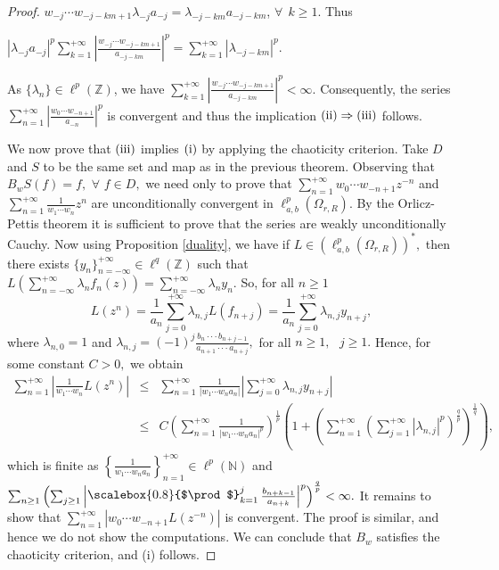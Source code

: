 \documentclass[12pt, reqno]{amsart}
\DeclareMathOperator*{\Mprod}{\text{\raisebox{0.25ex}{\scalebox{0.8}{$\prod$}}}}
\theoremstyle{definition}
\theoremstyle{remark}
\numberwithin{equation}{section}
\begin{document}
\begin{proof}
$w_{-j}\cdots w_{-j-km+1}\lambda_{-j}a_{-j}=\lambda_{-j-km}a_{-j-km}$, $\forall~~ k \geq 1.$ Thus
\begin{center}
$|\lambda_{-j}a_{-j}|^{p}\displaystyle\sum_{k=1}^{+\infty} \left\lvert\frac{w_{-j}\cdots w_{-j-km+1}}{a_{-j-km}}\right\rvert^{p}=\sum_{k=1}^{+\infty} \left\lvert\lambda_{-j-km}\right\rvert^{p}.$
\end{center}
 As $\{\lambda_{n}\} \in \ell^{p}(\mathbb{Z})$, we have $\sum_{k=1}^{+\infty} \left\lvert\frac{w_{-j}\cdots w_{-j-km+1}}{a_{-j-km}}\right\rvert^{p}<\infty.$ Consequently, the series\\ $\sum_{n=1}^{+\infty}\left\lvert  \frac{w_{0}\cdots w_{-n+1}}{a_{-n}}\right\rvert^{p}$ is convergent and thus the implication $\textnormal{(ii)} \Rightarrow \textnormal{(iii)}$ follows.

 We now prove that  $\textnormal{(iii)}$ implies $\textnormal{(i)}$ by applying the chaoticity criterion. Take $D$ and $S$ to be the same set and map as in the previous theorem. Observing that $B_{w}S(f)=f,$ $\forall$ $f\in D,$ we need only to prove that $\sum_{n=1}^{+\infty}w_{0}\cdots w_{-n+1}z^{-n}$ and  $ \sum_{n=1}^{+\infty} \frac{1}{w_{1}\cdots w_{n}}z^{n}$ are unconditionally convergent in $\ell^{p}_{a,b}(\Omega_{r,R}).$ By the Orlicz-Pettis theorem it is sufficient to prove that the series are weakly unconditionally Cauchy. Now using Proposition \ref{duality}, we have if $L\in (\ell^{p}_{a,b}(\Omega_{r,R}))^{*},$ then there exists $\{y_{n}\}_{n=-\infty}^{+\infty}\in \ell^{q}(\mathbb{Z})$ such that $L\left(\sum_{n=-\infty}^{+\infty}\lambda_{n}f_{n}(z)\right)=\sum_{n=-\infty}^{+\infty}\lambda_{n}y_{n}.$ So, for all $n\geq 1$
\[
L(z^{n})=\frac{1}{a_{n}}\sum_{j=0}^{+\infty}\lambda_{n,j}L(f_{n+j})=\frac{1}{a_{n}}\sum_{j=0}^{+\infty}\lambda_{n,j}y_{n+j},
\]
where $\lambda_{n,0}=1$ and $ \lambda_{n,j}=(-1)^{j}\frac{b_{n}\cdot\cdot \cdot b_{n+j-1}}{a_{n+1}\cdot\cdot \cdot a_{n+j}},$ for all $n\geq 1,~~~ j\geq 1.$
Hence, for some constant $C>0,$ we obtain
\begin{eqnarray*}
    \sum_{n=1}^{+\infty}\left\lvert\frac{1}{w_1\cdots w_n}L(z^n)\right\rvert&\leq& \sum_{n=1}^{+\infty}\frac{1}{|w_{1}\cdots w_{n}a_{n}|}\left\lvert\sum_{j=0}^{+\infty}\lambda_{n,j}y_{n+j}\right\rvert\\
    &\leq&C\left(\sum_{n=1}^{+\infty}\frac{1}{|w_{1}\cdots w_{n}a_{n}|^{p}}\right)^{\frac{1}{p}}\left(1+\left(\sum_{n=1}^{+\infty}\left(\sum_{j=1}^{+\infty}|\lambda_{n,j}|^p\right)^{\frac{q}{p}}\right)^{\frac{1}{q}}\right),
\end{eqnarray*}
which is finite as $\left\{\frac{1}{w_{1}\cdots w_{n}a_n}\right\}_{n=1}^{+\infty}\in \ell^{p}(\mathbb{N})$ and  $\sum_{n\geq 1}\left(\sum_{j\geq 1}\left\lvert \Mprod_{k=1}^{j}\frac{b_{n+k-1}}{ a_{n+k}}\right\rvert^{p}\right)^{\frac{q}{p}}<\infty.$ It remains to show that $\sum_{n=1}^{+\infty} |w_{0}\cdots w_{-n+1}L(z^{-n})|$ is  convergent. The proof is similar, and hence we do not show the computations. We can conclude that $B_{w}$ satisfies the chaoticity criterion, and (i) follows.
    \end{proof}
\end{document}

